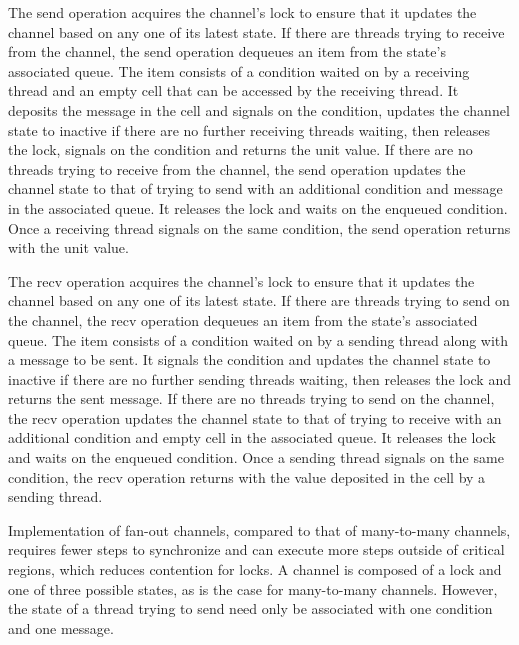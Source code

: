 The send operation acquires the channel's lock to ensure that it updates the channel based on
any one of its latest state.  If there are threads trying to receive from the channel, the send
operation dequeues an item from the state's associated queue.  The item consists of a condition
waited on by a receiving thread and an empty cell that can be accessed by the receiving thread.
It deposits the message in the cell and signals on the condition, updates the channel state to
inactive if there are no further receiving threads waiting, then releases the lock, signals on
the condition and returns the unit value.  If there are no threads trying to receive from the
channel, the send operation updates the channel state to that of trying to send with an
additional condition and message in the associated queue.  It releases the lock and waits on
the enqueued condition.  Once a receiving thread signals on the same condition, the send
operation returns with the unit value.

The recv operation acquires the channel's lock to ensure that it updates the channel based on
any one of its latest state.  If there are threads trying to send on the channel, the recv
operation dequeues an item from the state's associated queue.  The item consists of a condition
waited on by a sending thread along with a message to be sent.  It signals the condition and
updates the channel state to inactive if there are no further sending threads waiting, then
releases the lock and returns the sent message.  If there are no threads trying to send on the
channel, the recv operation updates the channel state to that of trying to receive with an
additional condition and empty cell in the associated queue.  It releases the lock and waits on
the enqueued condition.  Once a sending thread signals on the same condition, the recv
operation returns with the value deposited in the cell by a sending thread.


Implementation of fan-out channels, compared to that of many-to-many channels, requires fewer
steps to synchronize and can execute more steps outside of critical regions, which reduces
contention for locks.  A channel is composed of a lock and one of three possible states, as is
the case for many-to-many channels.  However, the state of a thread trying to send need only be
associated with one condition and one message.  

